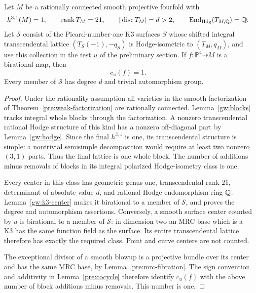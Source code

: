 \begin{proposition}
\label{gw:net-center}
Let $M$ be a rationally connected smooth projective fourfold with
\[
 h^{3,1}(M)=1,\qquad \operatorname{rank}T_M=21,\qquad
 |\operatorname{disc}T_M|=d>2,\qquad
 \operatorname{End}_{\mathrm{Hdg}}(T_{M,\mathbb Q})=\mathbb Q.
\]
Let $\mathcal S$ consist of the Picard-number-one K3 surfaces $S$ whose
shifted integral transcendental lattice $(T_S(-1),-q_S)$ is Hodge-isometric
to $(T_M,q_M)$, and use this collection in the test $u$ of
the preliminary section.  If $f:\mathbb P^4\dashrightarrow M$ is a
birational map, then
\[
                              c_u(f)=1.
\]
Every member of $\mathcal S$ has degree $d$ and trivial automorphism group.
\end{proposition}
\begin{proof}
Under the rationality assumption all varieties in the smooth factorization
of Theorem~\ref{pre:weak-factorization} are rationally connected.
Lemma~\ref{gw:blocks} tracks integral whole blocks through the factorization.
A nonzero transcendental rational Hodge structure of this kind has a
nonzero off-diagonal part by Lemma~\ref{gw:hodge}.  Since the final
$h^{3,1}$ is one, its transcendental structure is simple: a nontrivial
semisimple decomposition would require at least two nonzero $(3,1)$ parts.
Thus the final lattice is one whole block.  The number of additions minus
removals of blocks in its integral polarized Hodge-isometry class is one.

Every center in this class has geometric genus one, transcendental rank
$21$, determinant of absolute value $d$, and rational Hodge endomorphism
ring $\mathbb Q$.  Lemma~\ref{gw:k3-center} makes it birational to a member of
$\mathcal S$, and proves the degree and automorphism assertions.  Conversely,
a smooth surface center counted by $u$ is birational to a member of
$\mathcal S$: in dimension two an MRC base which is a K3 has the same
function field as the surface.  Its entire transcendental lattice therefore
has exactly the required class.  Point and curve centers are not counted.

The exceptional divisor of a smooth blowup is a projective bundle over its
center and has the same MRC base, by Lemma~\ref{pre:mrc-fibration}.
The sign convention and additivity in Lemma~\ref{pre:cocycle}
therefore identify $c_u(f)$ with the above number of block additions minus
removals.  This number is one.
\end{proof}
